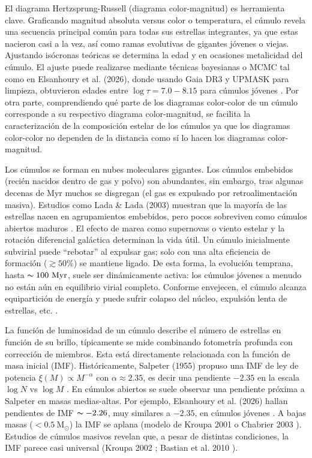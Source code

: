    El diagrama Hertzsprung-Russell (diagrama color-magnitud) es herramienta 
    clave. Graficando magnitud absoluta versus color o temperatura, el cúmulo 
    revela una secuencia principal común para todas sus estrellas integrantes, 
    ya que estas nacieron casi a la vez, así como ramas evolutivas de gigantes 
    jóvenes o viejas. Ajustando isócronas teóricas se determina la edad y en 
    ocasiones metalicidad del cúmulo. El ajuste puede realizarse mediante 
    técnicas bayesianas o MCMC tal como en Elsanhoury et al. (2026), donde 
    usando Gaia DR3 y UPMASK para limpieza, obtuvieron edades entre $\log \tau = 
    7.0 - 8.15$ para cúmulos jóvenes \cite{Elsanhoury2026}. Por otra parte, 
    comprendiendo qué parte de los diagramas color-color de un cúmulo 
    corresponde a su respectivo diagrama color-magnitud, se facilita la 
    caracterización de la composición estelar de los cúmulos ya que los 
    diagramas color-color no dependen de la distancia como sí lo hacen los 
    diagramas color-magnitud.

    Los cúmulos se forman en nubes moleculares gigantes. Los cúmulos embebidos 
    (recién nacidos dentro de gas y polvo) son abundantes, sin embargo, tras 
    algunas decenas de Myr muchos se disgregan (el gas es expulsado por 
    retroalimentación masiva). Estudios como Lada \& Lada (2003) muestran que la 
    mayoría de las estrellas nacen en agrupamientos embebidos, pero pocos 
    sobreviven como cúmulos abiertos maduros \cite{Lada2003}. El efecto de marea 
    como supernovas o viento estelar y la rotación diferencial galáctica 
    determinan la vida útil. Un cúmulo inicialmente subvirial puede ``rebotar'' 
    al expulsar gas; solo con una alta eficiencia de formación ($\gtrsim 50 \%$) 
    se mantiene ligado. De esta forma, la evolución temprana, hasta $\thicksim 
    100 \ \text{Myr}$, suele ser dinámicamente activa: los cúmulos jóvenes a 
    menudo no están aún en equilibrio virial completo. Conforme envejecen, el 
    cúmulo alcanza equipartición de energía y puede sufrir colapso del núcleo, 
    expulsión lenta de estrellas, etc. \cite{Spitzer1987}\cite{heggie2003book}.

    La función de luminosidad de un cúmulo describe el número de estrellas en 
    función de su brillo, típicamente se mide combinando fotometría profunda con 
    corrección de miembros. Esta está directamente relacionada con la función de 
    masa inicial (IMF). Históricamente, Salpeter (1955) propuso una IMF de ley 
    de potencia $\xi(M) \varpropto M^{-\alpha}$ con $\alpha \approx 2.35$, es 
    decir una pendiente $-2.35$ en la escala $\log N$ vs $\log M$ 
    \cite{salpeter1955luminosity}. En cúmulos abiertos se suele observar una 
    pendiente próxima a Salpeter en masas medias-altas. Por ejemplo, Elsanhoury 
    et al. (2026) hallan pendientes de IMF $\thicksim -2.26$, muy similares a 
    $-2.35$, en cúmulos jóvenes \cite{Elsanhoury2026}. A bajas masas ($< 0.5 \ 
    \text{M}_\odot$) la IMF se aplana (modelo de Kroupa 2001 
    \cite{kroupa2001variation} o Chabrier 2003 \cite{chabrier2003galactic}). 
    Estudios de cúmulos masivos revelan que, a pesar de distintas condiciones, 
    la IMF parece casi universal (Kroupa 2002 \cite{kroupa2002initial}; 
    Bastian et al. 2010 \cite{bastian2010universal}).

